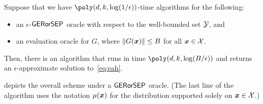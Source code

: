 \begin{theorem}
    \label{theorem:either}
    Suppose that we have $\poly(d, k, \log(1/\epsilon))$-time algorithms for the following:
    \begin{itemize}[noitemsep,topsep=0pt]
        \item an $\epsilon$-$\textsf{GERorSEP}$ oracle with respect to the well-bounded set ${\mathcal{Y}}$, and
        \item an evaluation oracle for $G$, where $\| G({\bm{x}}) \| \leq B$ for all ${\bm{x}} \in {\mathcal{X}}$.
    \end{itemize}
    Then, there is an algorithm that runs in time $\poly(d, k, \log(B/\epsilon))$ and returns an $\epsilon$-approximate solution to~\eqref{eq:eah}.
\end{theorem}

 depicts the overall scheme under a $\textsf{GERorSEP}$ oracle. (The last line of the algorithm uses the notation $\mu({\bm{x}})$ for the distribution supported solely on ${\bm{x}} \in {\mathcal{X}}$.)